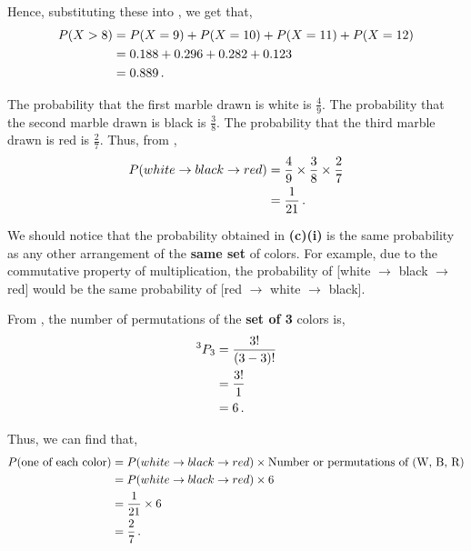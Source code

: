 \begin{subquestions}
Hence, substituting these into , we get that,
\begin{align}
P(X > 8) & = P(X=9)+P(X=10)+P(X=11)+P(X=12) \nonumber \\
& = 0.188+0.296+0.282+0.123 \nonumber \\
& = 0.889 \,.      
\end{align}


\subquestion
 
\begin{subsubquestions}
	
\subsubquestion

The probability that the first marble drawn is white is $\frac{4}{9}$. The probability that the second marble drawn is black is $\frac{3}{8}$. The probability that the third marble drawn is red is $\frac{2}{7}$. Thus, from , 
\begin{align}
	P(white \rightarrow black \rightarrow red) & = \frac{4}{9} \times \frac{3}{8} \times \frac{2}{7} \nonumber \\
	                                           & = \frac{1}{21} \,.
\end{align}
	

\subsubquestion

We should notice that the probability obtained in \textbf{(c)(i)} is the same probability as any other arrangement of the \textbf{same set} of colors. For example, due to the commutative property of multiplication, the probability of [white $\rightarrow$ black $\rightarrow$ red] would be the same probability of [red $\rightarrow$ white $\rightarrow$ black]. 

From , the number of permutations of the \textbf{set of 3} colors is,
\begin{align}
	^3P_3 & = \frac{3!}{(3-3)!} \nonumber \\
	      & = \frac{3!}{1} \nonumber \\
	      & = 6 \,.
\end{align}

Thus, we can find that,
\begin{align}
	P(\text{one of each color}) & = P(white \rightarrow black \rightarrow red) \times \text{Number or permutations of (W, B, R)} \nonumber \\
	& = P(white \rightarrow black \rightarrow red) \times 6 \nonumber \\
	                     & = \frac{1}{21} \times 6 \nonumber \\
	                     & = \frac{2}{7} \,.
\end{align}


\end{subsubquestions}
\end{subquestions}
